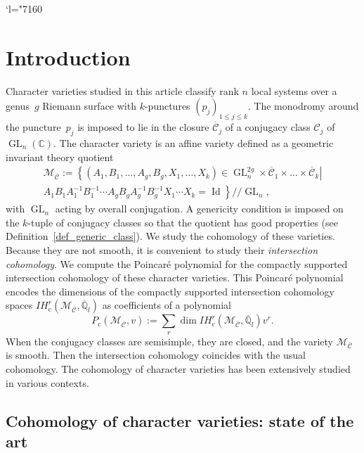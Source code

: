 \documentclass[11pt]{article}
\newcommand{\Subsection}{\subsection}
\newcommand{\Changel}{\mathcode`l="7160}
\newcommand{\gitquot}{/\!\!/}
\newcommand{\rc}{\mathrm{c}}
\theoremstyle{definition}
\theoremstyle{plain}
\DeclareMathOperator{\Id}{Id}
\DeclareMathOperator{\GL}{GL}
\newcommand{\C}{\mathbb{C}}
\newcommand{\qlbar}{\overline{\mathbb{Q}}_l}
\newcommand{\IH}{\mathit{IH}}
\newcommand{\inv}{^{-1}}
\newcommand{\mcbar}{\mathcal{M}_{\boldsymbol{\overline{\mathcal{C}}}}}
\begin{document}
\Changel

\section{Introduction}
Character varieties studied in this article classify rank $n$ local systems over a genus~$g$ Riemann surface with $k$-punctures $(p_j)_{1\le j \le k}$. The monodromy around the puncture~$p_j$ is imposed to lie in the closure $\overline{\mathcal{C}}_j$ of a conjugacy class $\mathcal{C}_j$ of $\GL_n(\C)$. The character variety is an affine variety defined as a geometric invariant theory quotient
\begin{multline*}
\mathcal{M}_{\boldsymbol{\overline{\mathcal{C}}}}:=\left\lbrace\left(A_1,B_1,\dots,A_g,B_g,X_1,\dots,X_k\right)\in \GL_n^{2g}\times \overline{\mathcal{C}}_{1}\times\dots\times \overline{\mathcal{C}}_{k}\right| \\ \left. A_1 B_1 A_1\inv B_1\inv \cdots A_g B_g A_g\inv B_g\inv X_1\cdots X_k =\Id\right\rbrace \gitquot \GL_n,
\end{multline*}
with $\GL_n$ acting by overall conjugation. A genericity condition is imposed on the $k$\nobreakdash-tuple of conjugacy classes so that the quotient has good properties (see Definition~\ref{def_generic_class}). We study the cohomology of these varieties. Because they are not smooth, it is convenient to study their \textit{intersection cohomology}. We compute the Poincaré polynomial for the compactly supported intersection cohomology of these character varieties. This Poincaré polynomial encodes the dimensions of the compactly supported intersection cohomology spaces $\IH_{\rc}^r\left(\mathcal{M}_{\boldsymbol{\overline{\mathcal{C}}}}, \qlbar\right)$ as coefficients of a polynomial\vspace*{-2pt}\enlargethispage{.5\baselineskip}
\[
P_{\rc} \left(\mcbar, v\right):=\sum_r \dim \IH_{\rc}^r\left(\mathcal{M}_{\boldsymbol{\overline{\mathcal{C}}}}, \qlbar\right) v^r.
\]
When the conjugacy classes are semisimple, they are closed, and the variety $\mcbar$ is smooth. Then the intersection cohomology coincides with the usual cohomology. The cohomology of character varieties has been extensively studied in various contexts.

\Subsection{Cohomology of character varieties: state of the art}
\end{document}
